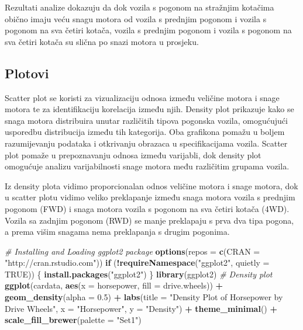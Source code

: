 \documentclass[
]{article}
\newenvironment{Shaded}{\begin{snugshade}}{\end{snugshade}}
\newcommand{\AttributeTok}[1]{\textcolor[rgb]{0.13,0.29,0.53}{#1}}
\newcommand{\CommentTok}[1]{\textcolor[rgb]{0.56,0.35,0.01}{\textit{#1}}}
\newcommand{\ConstantTok}[1]{\textcolor[rgb]{0.56,0.35,0.01}{#1}}
\newcommand{\ControlFlowTok}[1]{\textcolor[rgb]{0.13,0.29,0.53}{\textbf{#1}}}
\newcommand{\FloatTok}[1]{\textcolor[rgb]{0.00,0.00,0.81}{#1}}
\newcommand{\FunctionTok}[1]{\textcolor[rgb]{0.13,0.29,0.53}{\textbf{#1}}}
\newcommand{\NormalTok}[1]{#1}
\newcommand{\SpecialCharTok}[1]{\textcolor[rgb]{0.81,0.36,0.00}{\textbf{#1}}}
\newcommand{\StringTok}[1]{\textcolor[rgb]{0.31,0.60,0.02}{#1}}
\begin{document}
Rezultati analize dokazuju da dok vozila s pogonom na stražnjim kotačima
obično imaju veću snagu motora od vozila s prednjim pogonom i vozila s
pogonom na sva četiri kotača, vozila s prednjim pogonom i vozila s
pogonom na sva četiri kotača su slična po snazi motora u prosjeku.

\subsection{Plotovi}\label{plotovi}

Scatter plot se koristi za vizualizaciju odnosa između veličine motora i
snage motora te za identifikaciju korelacija između njih. Density plot
prikazuje kako se snaga motora distribuira unutar različitih tipova
pogonska vozila, omogućujući usporedbu distribucija između tih
kategorija. Oba grafikona pomažu u boljem razumijevanju podataka i
otkrivanju obrazaca u specifikacijama vozila. Scatter plot pomaže u
prepoznavanju odnosa između varijabli, dok density plot omogućuje
analizu varijabilnosti snage motora među različitim grupama vozila.

Iz density plota vidimo proporcionalan odnos veličine motora i snage
motora, dok u scatter plotu vidimo veliko preklapanje između snaga
motora vozila s prednjim pogonom (FWD) i snaga motora vozila s pogonom
na sva četiri kotača (4WD). Vozila sa zadnjim pogonom (RWD) se manje
preklapaju s prva dva tipa pogona, a prema višim snagama nema
preklapanja s drugim pogonima.

\begin{Shaded}
\begin{Highlighting}[]
\CommentTok{\# Installing and Loading ggplot2 package}
\FunctionTok{options}\NormalTok{(}\AttributeTok{repos =} \FunctionTok{c}\NormalTok{(}\AttributeTok{CRAN =} \StringTok{"http://cran.rstudio.com"}\NormalTok{))}
\ControlFlowTok{if}\NormalTok{ (}\SpecialCharTok{!}\FunctionTok{requireNamespace}\NormalTok{(}\StringTok{"ggplot2"}\NormalTok{, }\AttributeTok{quietly =} \ConstantTok{TRUE}\NormalTok{)) \{}
    \FunctionTok{install.packages}\NormalTok{(}\StringTok{"ggplot2"}\NormalTok{)}
\NormalTok{\}}
\FunctionTok{library}\NormalTok{(ggplot2)}
\CommentTok{\# Density plot}
\FunctionTok{ggplot}\NormalTok{(cardata, }\FunctionTok{aes}\NormalTok{(}\AttributeTok{x =}\NormalTok{ horsepower, }\AttributeTok{fill =}\NormalTok{ drive.wheels)) }\SpecialCharTok{+}
  \FunctionTok{geom\_density}\NormalTok{(}\AttributeTok{alpha =} \FloatTok{0.5}\NormalTok{) }\SpecialCharTok{+}
  \FunctionTok{labs}\NormalTok{(}\AttributeTok{title =} \StringTok{"Density Plot of Horsepower by Drive Wheels"}\NormalTok{,}
       \AttributeTok{x =} \StringTok{"Horsepower"}\NormalTok{,}
       \AttributeTok{y =} \StringTok{"Density"}\NormalTok{) }\SpecialCharTok{+}
  \FunctionTok{theme\_minimal}\NormalTok{() }\SpecialCharTok{+}
  \FunctionTok{scale\_fill\_brewer}\NormalTok{(}\AttributeTok{palette =} \StringTok{"Set1"}\NormalTok{)}
\end{Highlighting}
\end{Shaded}
\end{document}
